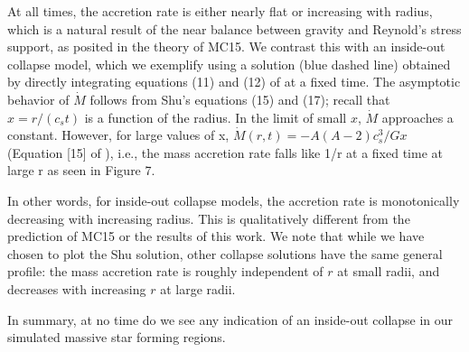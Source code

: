 \documentclass[../dissertation.tex]{subfiles}
\begin{document}
At all times, the accretion rate is either nearly flat or increasing with radius, which is a natural result of the near balance between gravity and Reynold's stress support, as posited in the theory of MC15. We contrast this with an inside-out collapse model, which we exemplify using a \citet{1977ApJ...214..488S} solution (blue dashed line) obtained by directly integrating equations (11) and (12) of \citet{1977ApJ...214..488S} at a fixed time. The asymptotic behavior of $\dot{M}$ follows from Shu's equations (15) and (17);
recall that $x = r/ (c_s  t)$ is a function of the radius. 
In the limit of small $x$, $\dot{M}$ approaches a constant.
However, for large values of x,  
$\dot M(r,t)=-A(A-2) c_s^3/Gx$ (Equation [15] of \citealt{1977ApJ...214..488S}), i.e., the mass accretion rate falls like 1/r at a fixed time at large r as seen in Figure 7. 

In other words, for inside-out collapse models, the accretion rate is monotonically decreasing with increasing radius. This is qualitatively different from the prediction of MC15 or the results of this work. We note that while we have chosen to plot the Shu solution, other collapse solutions \citep{1997ApJ...476..750M,2002Natur.416...59M,2003ApJ...585..850M} have the same general profile: the mass accretion rate is roughly independent of $r$ at small radii, and decreases with increasing $r$ at large radii.  

In summary, at no time do we see any indication of an inside-out collapse in our simulated massive star forming regions.   
\end{document}

